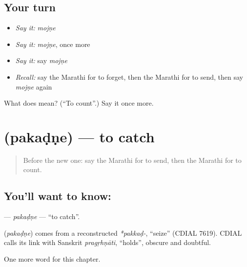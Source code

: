 \subsection*{Your turn}
\begin{itemize}
\raggedright
  \item \emph{Say it:} \emph{mojṇe}
  \item \emph{Say it:} \emph{mojṇe}, once more
  \item \emph{Say it:} say \emph{mojṇe}
  \item \emph{Recall:} say the Marathi for to forget, then the Marathi for to send, then say \emph{mojṇe} again
\end{itemize}

\begin{tcolorbox}[breakable,colback=teal!4,colframe=teal!35!black,title={Before you move on}]
What does  mean? (\textquotedblleft{}To count\textquotedblright{}.) Say it once more.
\end{tcolorbox}
\section[\texorpdfstring{\mr{पकडणे} (pakaḍṇe)}{पकडणे (pakaḍṇe)}]{ (pakaḍṇe) — to catch}

\label{lesson:MR-C80-pakadne}



\begin{quote}
Before the new one: say the Marathi for to send, then the Marathi for to count.
\end{quote}

\subsection*{You'll want to know: }
\textbf{} — \emph{pakaḍṇe} — \textquotedblleft{}to catch\textquotedblright{}.

\begin{cousinweb}
\textbf{} (\emph{pakaḍṇe}) comes from a reconstructed \emph{*pakkaḍ-}, \textquotedblleft{}seize\textquotedblright{} (CDIAL 7619). CDIAL calls its link with Sanskrit \emph{pragṛhṇāti}, \textquotedblleft{}holds\textquotedblright{}, obscure and doubtful.
\end{cousinweb}

\begin{grammarlens}[title={What you've built}]
One more word for this chapter.
\end{grammarlens}

